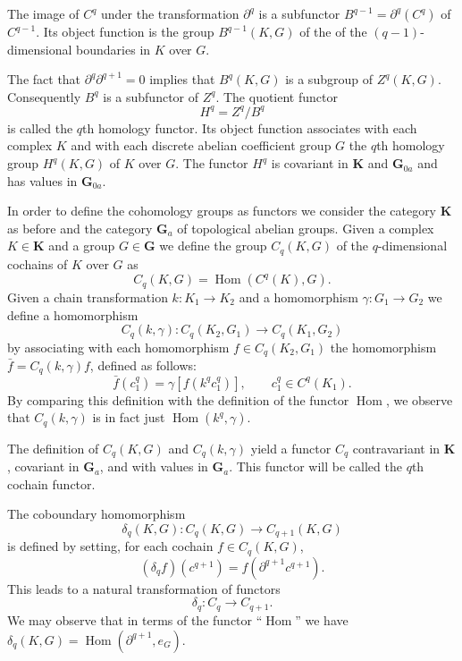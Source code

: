 \documentclass[11pt,a4paper]{report}
\DeclareMathOperator{\hm}{Hom}
\begin{document}
The image of $C^q$ under the transformation $\partial^q$ is a subfunctor $B^{q-1}=\partial^q(C^q)$ of $C^{q-1}$.
Its object function is the group $B^{q-1}(K,G)$ of the of the $(q-1)$-dimensional boundaries in $K$ over $G$.

The fact that $\partial^q\partial^{q+1}=0$ implies that $B^q(K,G)$ is a subgroup of $Z^q(K,G)$. Consequently $B^q$
is a subfunctor of $Z^q$. The quotient functor
\begin{equation*}
	H^q= Z^q/B^q
\end{equation*}
is called the $q$th homology functor. Its object function associates with each complex $K$ and with each discrete
abelian coefficient group $G$ the $q$th homology group $H^q(K,G)$ of $K$ over $G$. The functor $H^q$ is covariant
in $\mathbf{K}$ and $\mathbf{G}_{0a}$ and has values in $\mathbf{G}_{0a}$.

In order to define the cohomology groups as functors we consider the category $\mathbf{K}$ as before and the
category $\mathbf{G}_a$ of topological abelian groups. Given a complex $K\in\mathbf{K}$ and a group $G\in\mathbf{G}$
we define the group $C_q(K,G)$ of the $q$-dimensional cochains of $K$ over $G$ as
\begin{equation*}
	C_q(K,G)=\hm(C^q(K),G).
\end{equation*}
Given a chain transformation $k:K_1\rightarrow K_2$ and a homomorphism $\gamma:G_1\rightarrow G_2$ we define
a homomorphism
\begin{equation*}
	C_q(k,\gamma):C_q(K_2,G_1)\rightarrow C_q(K_1,G_2)
\end{equation*}
by associating with each homomorphism $f\in C_q(K_2,G_1)$ the homomorphism $\bar{f}=C_q(k,\gamma)f$, defined as
follows:
\begin{equation*}
	\bar{f}(c_1^q)= \gamma[f(k^q c_1^q)],\qquad c_1^q\in C^q(K_1).
\end{equation*}
By comparing this definition with the definition of the functor $\hm$, we observe that $C_q(k,\gamma)$ is in fact
just $\hm(k^q,\gamma)$.

The definition of $C_q(K,G)$ and $C_q(k,\gamma)$ yield a functor $C_q$ contravariant in $\mathbf{K}$, covariant in
$\mathbf{G}_a$, and with values in $\mathbf{G}_a$. This functor will be called the $q$th cochain functor.

The coboundary homomorphism
\begin{equation*}
	\delta_q(K,G):C_q(K,G)\rightarrow C_{q+1}(K,G)
\end{equation*}
is defined by setting, for each cochain $f\in C_q(K,G)$,
\begin{equation*}
	(\delta_q f)(c^{q+1})= f(\partial^{q+1} c^{q+1}).
\end{equation*}
This leads to a natural transformation of functors
\begin{equation*}
	\delta_q:C_q\rightarrow C_{q+1}.
\end{equation*}
We may observe that in terms of the functor ``$\hm$'' we have $\delta_q(K,G)=\hm(\partial^{q+1},e_G)$.
\end{document}
